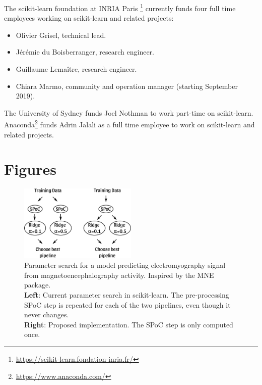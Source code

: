 \documentclass[11pt]{article}  %
\begin{document}
The scikit-learn foundation at INRIA Paris
\footnote{\href{https://scikit-learn.fondation-inria.fr/}{https://scikit-learn.fondation-inria.fr/}}
currently funds four full time employees working on scikit-learn and related
projects:
\begin{itemize}
\item Olivier Grisel, technical lead.
\item J\'er\'emie du Boisberranger, research engineer.
\item Guillaume Lema\^itre, research engineer.
\item Chiara Marmo, community and operation manager (starting September 2019).
\end{itemize}

The University of Sydney funds Joel Nothman to work part-time on
scikit-learn.
Anaconda\footnote{\href{https://www.anaconda.com/}{https://www.anaconda.com/}}
funds Adrin Jalali as a full time employee to work on scikit-learn and
related projects.

\clearpage
\section*{Figures}

\begin{figure}[h!]
  \centering
    \includegraphics[width=0.5\textwidth]{drawing}
  \caption{
      Parameter search for a model predicting electromyography signal
      from magnetoencephalography activity. Inspired by the MNE
      package\cite{MNE}.\\
      \textbf{Left}: Current parameter search in
      scikit-learn. The pre-processing SPoC step is repeated for each of the
      two pipelines, even though it never changes.\\
      \textbf{Right}: Proposed implementation. The SPoC step is only
      computed once.
      }
      \label{fig:fast_grid_search}
\end{figure}

\clearpage
\printbibliography
\end{document}
